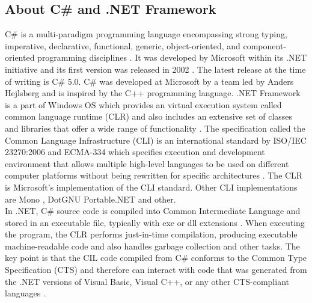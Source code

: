 \subsection{About C\# and .NET Framework}
C\# is a multi-paradigm programming language encompassing strong typing, imperative, declarative, functional, generic, object-oriented, and component-oriented programming disciplines \cite{cs1.0specs}. It was developed by Microsoft within its .NET initiative and its first version was released in 2002 \cite{cs1.0specs}. The latest release at the time of writing is C\# 5.0.
C\# was developed at Microsoft by a team led by Anders Hejlsberg and is inspired by the C++ programming language. .NET Framework is a part of Windows OS which provides an virtual execution system called common language runtime (CLR) and also includes an extensive set of classes and libraries that offer a wide range of functionality \cite{csAndDotNet}. The specification called the Common Language Infrastructure (CLI) is an international standard by ISO/IEC 23270:2006 and ECMA-334 which specifies execution and development environment that allows multiple high-level languages to be used on different computer platforms without being rewritten for specific architectures \cite{csAndDotNet}. The CLR is Microsoft's implementation of the CLI standard. Other CLI implementations are Mono \cite{mono}, DotGNU Portable.NET \cite{dotgnu} and other.\\
In .NET, C\# source code is compiled into Common Intermediate Language and stored in an executable file, typically with exe or dll extensions \cite{csAndDotNet}. When executing the program, the CLR performs just-in-time compilation, producing executable machine-readable code and also handles garbage collection and other tasks. The key point is that the CIL code compiled from C\# conforms to the Common Type Specification (CTS) and therefore can interact with code that was generated from the .NET versions of Visual Basic, Visual C++, or any other CTS-compliant languages \cite{csAndDotNet}.



